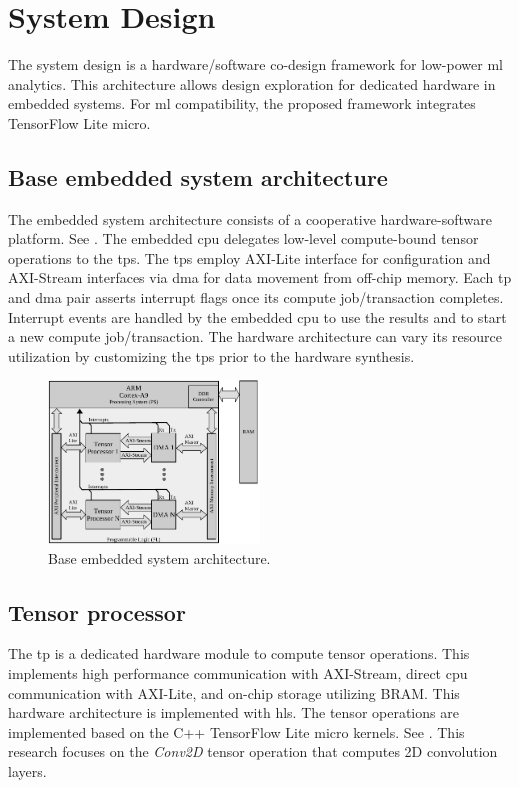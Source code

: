 \section{System Design}
\label{sec:system_design}
The system design is a hardware/software co-design framework for low-power \gls{ml} analytics. This architecture allows design exploration for dedicated hardware in embedded systems. For \gls{ml} compatibility, the proposed framework integrates TensorFlow Lite micro.

\subsection{Base embedded system architecture}
The embedded system architecture consists of a cooperative hardware-software platform. See . The embedded \gls{cpu} delegates low-level compute-bound tensor operations to the \glspl{tp}. The \glspl{tp} employ AXI-Lite interface for configuration and AXI-Stream interfaces via \gls{dma} for data movement from off-chip memory. Each \gls{tp} and \gls{dma} pair asserts interrupt flags once its compute job/transaction completes. Interrupt events are handled by the embedded \gls{cpu} to use the results and to start a new compute job/transaction. The hardware architecture can vary its resource utilization by customizing the \glspl{tp} prior to the hardware synthesis.
\begin{figure}[t!]
	\centering
	\includegraphics[width=0.5\textwidth]{./chapters/cnn_accelerator/figures/system_design.pdf}
	\caption{Base embedded system architecture.}
	\label{fig:system_architecture}
\end{figure}
\subsection{Tensor processor}
The \gls{tp} is a dedicated hardware module to compute tensor operations. This implements high performance communication with AXI-Stream, direct \gls{cpu} communication with AXI-Lite, and on-chip storage utilizing BRAM. This hardware architecture is implemented with \gls{hls}. The tensor operations are implemented based on the C++ TensorFlow Lite micro kernels. See . This research focuses on the \emph{Conv2D} tensor operation that computes 2D convolution layers.

